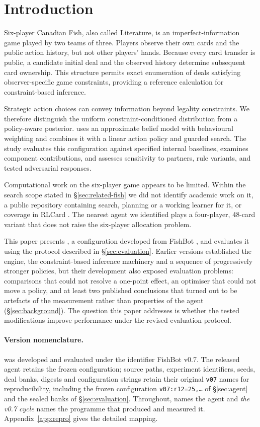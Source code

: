 \section{Introduction}
\label{sec:intro}

Six-player Canadian Fish, also called Literature, is an imperfect-information game played by two
teams of three. Players observe their own cards and the public action history, but not other
players' hands. Because every card transfer is public, a candidate initial deal and the observed
history determine subsequent card ownership. This structure permits exact enumeration of deals
satisfying observer-specific game constraints, providing a reference calculation for
constraint-based inference.

Strategic action choices can convey information beyond legality constraints. We therefore
distinguish the uniform constraint-conditioned distribution from a policy-aware posterior.
\sestina{} uses an approximate belief model with behavioural weighting and combines it with a linear
action policy and guarded search. The study evaluates this configuration against specified internal
baselines, examines component contributions, and assesses sensitivity to partners, rule variants,
and tested adversarial responses.

Computational work on the six-player game appears to be limited. Within the search scope stated
in \S\ref{sec:related-fish} we did not identify academic work on it, a public repository containing
search, planning or a working learner for it, or coverage in RLCard \cite{rlcard}. The nearest
agent we identified plays a four-player, 48-card variant that does not raise the six-player
allocation problem.

This paper presents \textbf{\sestina{}}, a configuration developed from FishBot \vsix{}, and
evaluates it using the protocol described in \S\ref{sec:evaluation}. Earlier versions established
the engine, the constraint-based inference machinery and a sequence of progressively stronger
policies, but their development also exposed evaluation problems: comparisons that could not resolve
a one-point effect, an optimiser that could not move a policy, and at least two published
conclusions that turned out to be artefacts of the measurement rather than properties of the agent
(\S\ref{sec:background}). The question this paper addresses is whether the tested modifications
improve performance under the revised evaluation protocol.

\paragraph{Version nomenclature.} \sestina{} was developed and evaluated under the identifier
FishBot v0.7. The released agent retains the frozen configuration; source paths, experiment
identifiers, seeds, deal banks, digests and configuration strings retain their original
\texttt{v07} names for reproducibility, including the frozen configuration
\texttt{v07:r12=25,\ldots} of \S\ref{sec:agent} and the sealed banks of \S\ref{sec:evaluation}.
Throughout, \emph{\sestina{}} names the agent and \emph{the v0.7 cycle} names the programme that
produced and measured it. Appendix~\ref{app:repro} gives the detailed mapping.


